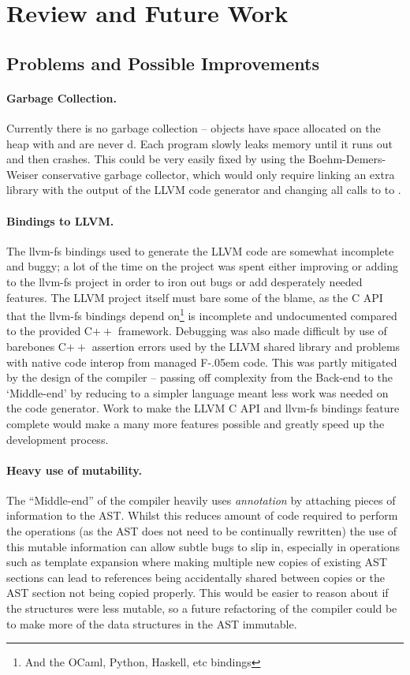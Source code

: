 \documentclass{article}
\newcommand{\bt}{\ensuremath{^{\backprime}}}
\newcommand{\sharponend}[1]{{\settoheight{\dimen0}{#1}#1\kern-.05em \resizebox{!}{\dimen0}{\raisebox{\depth}{\fontseries{b}\selectfont\#}}}}
\newcommand{\fsharp}{\sharponend{F}\xspace}
\newcommand*{\cpp}{C\ensuremath{++}\xspace}
\newcommand{\code}[1]{\texttt{\StrSubstitute{#1}{`}{\bt}}}
\newcommand{\bcode}[1]{\code{#1}}
\begin{document}
\section{Review and Future Work}
\subsection{Problems and Possible Improvements}
\paragraph{Garbage Collection.}
Currently there is no garbage collection -- objects have space allocated on the heap with \bcode{malloc} and are never \bcode{free}d. Each program slowly leaks memory until it runs out and then crashes. This could be very easily fixed by using the Boehm-Demers-Weiser conservative garbage collector, which would only require linking an extra library with the output of the LLVM code generator and changing all calls to \bcode{malloc} to \bcode{GC\_MALLOC}.

\paragraph{Bindings to LLVM.}
The llvm-fs bindings used to generate the LLVM code are somewhat incomplete and buggy; a lot of the time on the project was spent either improving or adding to the llvm-fs project in order to iron out bugs or add desperately needed features. The LLVM project itself must bare some of the blame, as the C API that the llvm-fs bindings depend on\footnote{And the OCaml, Python, Haskell, etc bindings} is incomplete and undocumented compared to the provided \cpp framework. Debugging was also made difficult by use of barebones \cpp assertion errors used by the LLVM shared library and problems with native code interop from managed \fsharp code. This was partly mitigated by the design of the compiler -- passing off complexity from the Back-end to the `Middle-end' by reducing to a simpler language meant less work was needed on the code generator. Work to make the LLVM C API and llvm-fs bindings feature complete would make a many more features possible and greatly speed up the development process.

\paragraph{Heavy use of mutability.}
The ``Middle-end'' of the compiler heavily uses \textit{annotation} by attaching pieces of information to the AST. Whilst this reduces amount of code required to perform the operations (as the AST does not need to be continually rewritten) the use of this mutable information can allow subtle bugs to slip in, especially in operations such as template expansion where making multiple new copies of existing AST sections can lead to references being accidentally shared between copies or the AST section not being copied properly. This would be easier to reason about if the structures were less mutable, so a future refactoring of the compiler could be to make more of the data structures in the AST immutable.
\end{document}
